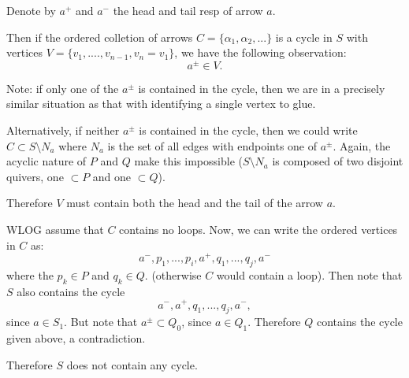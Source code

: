 \documentclass{article}
\begin{document}
\begin{framed}
\begin{center}
\end{center}

Denote by $a^+$ and $a^-$ the head and tail resp of arrow $a$. 

Then if the ordered colletion of arrows 
$C=\{\alpha_1,\alpha_2,...\}$ is a cycle in $S$ with 
vertices $V=\{v_1,....,v_{n-1},v_n=v_1\}$, 
we have the following observation: $$a^\pm\in V.$$ 

Note: if only one of the $a^\pm$ is contained in the cycle, then we are in a 
precisely similar situation as that with identifying a single vertex to glue. 

Alternatively, if neither $a^\pm$ is contained in the cycle, then we could 
write $C\subset S\setminus N_a$ where $N_a$ is the set of all edges 
with endpoints one of $a^{\pm}$. 
Again, the acyclic nature of $P$ and $Q$ make this impossible 
($S\setminus N_a$ is composed of two disjoint quivers, 
one $\subset P$ and one $\subset Q$). 

Therefore $V$ must contain both the head and the tail of the arrow $a$. 

WLOG assume that $C$ contains no loops. 
Now, we can write the ordered vertices in $C$ as: 
$$a^-, p_1,...,p_i,a^+,q_1,...,q_j,a^-$$ where the $p_k\in P$ and $q_k\in Q$. 
(otherwise $C$ would contain a loop). 
Then note that $S$ also contains the cycle 
$$a^-,a^+,q_1,...,q_j,a^-,$$ since $a\in S_1$. 
But note that $a^\pm\subset Q_0$, since $a\in Q_1$. Therefore 
$Q$ contains the cycle given above, a contradiction. 

Therefore $S$ does not contain any cycle. 
\end{framed}
\end{document}

